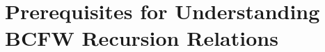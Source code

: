 \part{Prerequisites for Understanding BCFW Recursion Relations}
\label{part:prerequisites-for-understanding-bcfw-recursion-relations}





